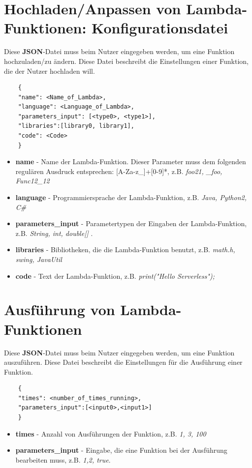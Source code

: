 \documentclass[a4paper,20pt,oneside]{book}
\begin{document}
	\section{Hochladen/Anpassen von Lambda-Funktionen: Konfigurationsdatei}
	Diese \textbf{JSON}-Datei muss beim Nutzer eingegeben werden, um eine Funktion hochzuladen/zu ändern. Diese Datei beschreibt die Einstellungen einer  Funktion, die der Nutzer hochladen will. 
	\begin{lstlisting}
	{
	"name": <Name_of_Lambda>, 
	"language": <Language_of_Lambda>, 
	"parameters_input": [<type0>, <type1>], 
	"libraries":[library0, library1], 
	"code": <Code>
	}	
	\end{lstlisting}
	\begin{itemize}
		\item \textbf{name} - Name der Lambda-Funktion. Dieser Parameter muss dem folgenden regulären Ausdruck entsprechen: [A-Za-z\_]+[0-9]*, z.B. \textit{foo21, \_foo, Func12\_12}
		\item \textbf{language} - Programmiersprache der Lambda-Funktion, z.B. \textit{ Java, Python2, C\#}
		\item \textbf{parameters\_input} - Parametertypen der Eingaben der Lambda-Funktion, z.B. \textit{String, int, double[]} .
		\item \textbf{libraries} - Bibliotheken, die die Lambda-Funktion benutzt, z.B. \textit{math.h, swing, JavaUtil}
		\item \textbf{code} - Text der Lambda-Funktion, z.B. \textit{print("Hello Serverless");}
	\end{itemize}
	\clearpage
	\section{Ausführung von Lambda-Funktionen }
	Diese \textbf{JSON}-Datei muss beim Nutzer eingegeben werden, um eine Funktion auszuführen. Diese Datei beschreibt die Einstellungen für die Ausführung einer Funktion.
	\begin{lstlisting}
	{
	"times": <number_of_times_running>,
	"parameters_input":[<input0>,<input1>] 
	}
	\end{lstlisting}
	\begin{itemize}
		\item \textbf{times} - Anzahl von Ausführungen der Funktion, z.B. \textit{1, 3, 100}
		\item \textbf{parameters\_input} - Eingabe, die eine Funktion bei der Ausführung bearbeiten muss, z.B. \textit{1,2, true}. 
	\end{itemize}
    
\end{document}
